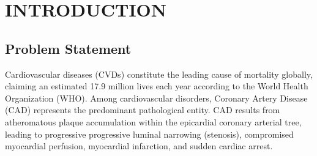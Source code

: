 \chapter{INTRODUCTION}

\section{Problem Statement}
Cardiovascular diseases (CVDs) constitute the leading cause of mortality globally, claiming an estimated 17.9 million lives each year according to the World Health Organization (WHO). Among cardiovascular disorders, Coronary Artery Disease (CAD) represents the predominant pathological entity. CAD results from atheromatous plaque accumulation within the epicardial coronary arterial tree, leading to progressive progressive luminal narrowing (stenosis), compromised myocardial perfusion, myocardial infarction, and sudden cardiac arrest. 

